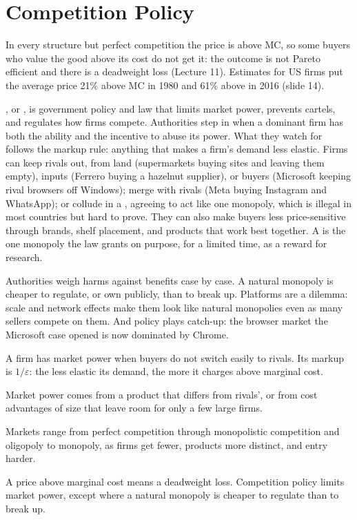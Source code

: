 \documentclass[11pt]{article}
\begin{document}
\section{Competition Policy}

In every structure but perfect competition the price is above MC, so some buyers who value the good above its cost do not get it: the outcome is not Pareto efficient and there is a deadweight loss (Lecture 11). Estimates for US firms put the average price 21\% above MC in 1980 and 61\% above in 2016 (slide 14).

, or , is government policy and law that limits market power, prevents cartels, and regulates how firms compete. Authorities step in when a dominant firm has both the ability and the incentive to abuse its power. What they watch for follows the markup rule: anything that makes a firm's demand less elastic. Firms can keep rivals out, from land (supermarkets buying sites and leaving them empty), inputs (Ferrero buying a hazelnut supplier), or buyers (Microsoft keeping rival browsers off Windows); merge with rivals (Meta buying Instagram and WhatsApp); or collude in a , agreeing to act like one monopoly, which is illegal in most countries but hard to prove. They can also make buyers less price-sensitive through brands, shelf placement, and products that work best together. A  is the one monopoly the law grants on purpose, for a limited time, as a reward for research.

Authorities weigh harms against benefits case by case. A natural monopoly is cheaper to regulate, or own publicly, than to break up. Platforms are a dilemma: scale and network effects make them look like natural monopolies even as many sellers compete on them. And policy plays catch-up: the browser market the Microsoft case opened is now dominated by Chrome.

\begin{takeaways}
\item A firm has market power when buyers do not switch easily to rivals. Its markup is $1/\varepsilon$: the less elastic its demand, the more it charges above marginal cost.
\item Market power comes from a product that differs from rivals', or from cost advantages of size that leave room for only a few large firms.
\item Markets range from perfect competition through monopolistic competition and oligopoly to monopoly, as firms get fewer, products more distinct, and entry harder.
\item A price above marginal cost means a deadweight loss. Competition policy limits market power, except where a natural monopoly is cheaper to regulate than to break up.
\end{takeaways}
\end{document}
